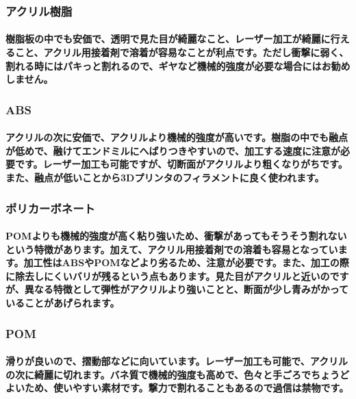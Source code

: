 \documentclass[b5paper, 9pt, twocolumn, titlepage,openany]{jsbook}%
\begin{document}
\subsubsection{アクリル樹脂}

\paragraph{樹脂板の中でも安価で、透明で見た目が綺麗なこと、レーザー加工が綺麗に行えること、アクリル用接着剤で溶着が容易なことが利点です。ただし衝撃に弱く、割れる時にはパキっと割れるので、ギヤなど機械的強度が必要な場合にはお勧めしません。}

\subsubsection{ABS}

\paragraph{アクリルの次に安価で、アクリルより機械的強度が高いです。樹脂の中でも融点が低めで、融けてエンドミルにへばりつきやすいので、加工する速度に注意が必要です。レーザー加工も可能ですが、切断面がアクリルより粗くなりがちです。また、融点が低いことから3Dプリンタのフィラメントに良く使われます。}

\subsubsection{ポリカーボネート}

\paragraph{POMよりも機械的強度が高く粘り強いため、衝撃があってもそうそう割れないという特徴があります。加えて、アクリル用接着剤での溶着も容易となっています。加工性はABSやPOMなどより劣るため、注意が必要です。また、加工の際に除去しにくいバリが残るという点もあります。見た目がアクリルと近いのですが、異なる特徴として弾性がアクリルより強いことと、断面が少し青みがかっていることがあげられます。}

\subsubsection{POM}

\paragraph{滑りが良いので、摺動部などに向いています。レーザー加工も可能で、アクリルの次に綺麗に切れます。バネ質で機械的強度も高めで、色々と手ごろでちょうどよいため、使いやすい素材です。撃力で割れることもあるので過信は禁物です。}
\end{document}
